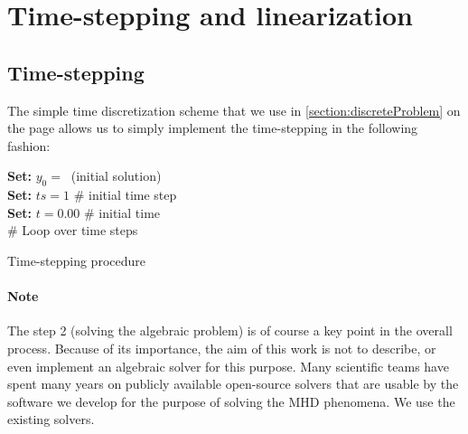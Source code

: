 \section{Time-stepping and linearization}

\subsection{Time-stepping}
The simple time discretization scheme that we use in \ref{section:discreteProblem} on the page \pageref{section:discreteProblem} allows us to simply implement the time-stepping in the following fashion:\\
\begin{algorithm}[H]
\textbf{    Set: }$y_0 =\ $ (initial solution)\\
\textbf{    Set: }$ts =1 $ \# initial time step\\
\textbf{    Set: }$t = 0.00 $ \# initial time\\
    \# Loop over time steps\\

    \caption{Time-stepping procedure}
\end{algorithm}
\paragraph{Note}
\label{note:solvers}
The step 2 (solving the algebraic problem) is of course a key point in the overall process. Because of its importance, the aim of this work is not to describe, or even implement an algebraic solver for this purpose. Many scientific teams have spent many years on publicly available open-source solvers that are usable by the software we develop for the purpose of solving the MHD phenomena. We use the existing solvers.